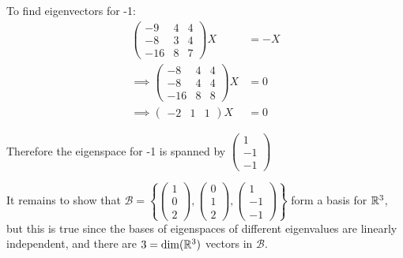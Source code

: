 \documentclass[a4paper, 10pt]{article}
\begin{document}
\begin{solution}
    To find eigenvectors for -1:
    \begin{align*}
        \begin{pmatrix}
            -9  & 4 & 4 \\
            -8  & 3 & 4 \\
            -16 & 8 & 7
        \end{pmatrix} X          & = -X \\
        \implies \begin{pmatrix}
                     -8  & 4 & 4 \\
                     -8  & 4 & 4 \\
                     -16 & 8 & 8
                 \end{pmatrix} X & = 0  \\
        \implies \begin{pmatrix}
                     -2 & 1 & 1
                 \end{pmatrix} X & = 0
    \end{align*}

    Therefore the eigenspace for -1 is spanned by \(\begin{pmatrix}
        1 \\ -1 \\ -1
    \end{pmatrix}\)

    It remains to show that \(\mathcal{B} = \left\{\begin{pmatrix}
        1 \\ 0 \\ 2
    \end{pmatrix},\begin{pmatrix}
        0 \\ 1 \\ 2
    \end{pmatrix},\begin{pmatrix}
        1 \\ -1 \\ -1
    \end{pmatrix}\right\}\) form a basis for \(\mathbb{R}^3\), but this is true since the bases of eigenspaces of different eigenvalues are linearly independent, and there are \(3 = \dim(\mathbb{R}^3)\) vectors in \(\mathcal{B}\).
\end{solution}
\end{document}
